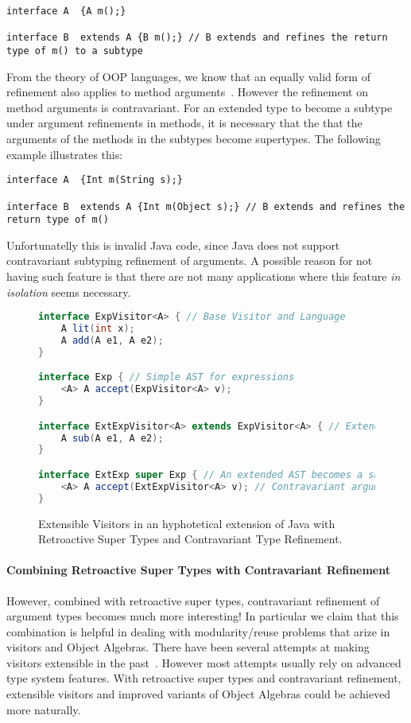 \begin{lstlisting}
interface A  {A m();} 

interface B  extends A {B m();} // B extends and refines the return type of m() to a subtype
\end{lstlisting}

\noindent From the theory of OOP languages, we know that an equally
valid form of refinement also applies to method arguments~\cite{}. However 
the refinement on method arguments is contravariant. For an
extended type to become a subtype under argument refinements in
methods, it is necessary that the  that the arguments of the methods
in the subtypes become supertypes. The following example illustrates 
this: 

\begin{lstlisting}
interface A  {Int m(String s);} 

interface B  extends A {Int m(Object s);} // B extends and refines the return type of m()
\end{lstlisting}

\noindent Unfortunatelly this is invalid Java code, since Java 
does not support contravariant subtyping refinement of arguments. 
A possible reason for not having such feature is that there are not
many applications where this feature \emph{in isolation} seems necessary. 

\begin{figure}
\begin{lstlisting}[language=java]
interface ExpVisitor<A> { // Base Visitor and Language
	A lit(int x);
	A add(A e1, A e2);
}

interface Exp { // Simple AST for expressions
	<A> A accept(ExpVisitor<A> v);
}

interface ExtExpVisitor<A> extends ExpVisitor<A> { // Extended Visitor and Language
	A sub(A e1, A e2);
}

interface ExtExp super Exp { // An extended AST becomes a supertype of the original one
	<A> A accept(ExtExpVisitor<A> v); // Contravariant argument refinement
}
\end{lstlisting}
\caption{Extensible Visitors in an hyphotetical
  extension of Java with Retroactive Super Types and Contravariant
  Type Refinement.}
\label{fig:JVis}
\end{figure}

\paragraph{Combining Retroactive Super Types with Contravariant Refinement}
However, combined with retroactive super types, contravariant
refinement of argument types becomes 
much more interesting! In particular we claim that this combination is 
helpful in dealing with modularity/reuse problems that arize in
visitors and Object Algebras. There have been several attempts 
at making visitors extensible in the past~\cite{}. However most
attempts usually rely on advanced type system features. With retroactive super
types and contravariant refinement, extensible visitors and improved
variants of Object Algebras could be achieved more naturally.  

